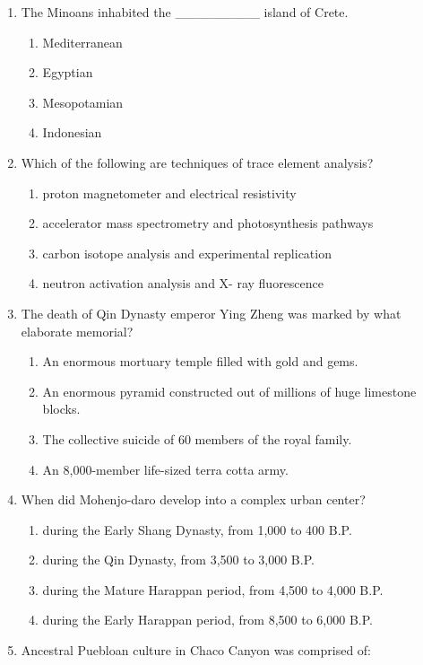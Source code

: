 \documentclass[12pt]{article}
\begin{document}
\begin{enumerate}[label=\arabic*.]
\begin{enumerate}[label=(\alph*)]
    \item genera,
\end{enumerate}
\item The Minoans inhabited the \_\_\_\_\_\_\_\_\_ island of Crete.
\begin{enumerate}[label=(\alph*)]
    \item Mediterranean
    \item Egyptian
    \item Mesopotamian
    \item Indonesian
\end{enumerate}
\item Which of the following are techniques of trace element analysis?
\begin{enumerate}[label=(\alph*)]
    \item proton magnetometer and electrical resistivity
    \item accelerator mass spectrometry and photosynthesis pathways
    \item carbon isotope analysis and experimental replication
    \item neutron activation analysis and X- ray fluorescence
\end{enumerate}
\item The death of Qin Dynasty emperor Ying Zheng was marked by what elaborate memorial?
\begin{enumerate}[label=(\alph*)]
    \item An enormous mortuary temple filled with gold and gems.
    \item An enormous pyramid constructed out of millions of huge limestone blocks.
    \item The collective suicide of 60 members of the royal family.
    \item An 8,000-member life-sized terra cotta army.
\end{enumerate}
\item When did Mohenjo-daro develop into a complex urban center?
\begin{enumerate}[label=(\alph*)]
    \item during the Early Shang Dynasty, from 1,000 to 400 B.P.
    \item during the Qin Dynasty, from 3,500 to 3,000 B.P.
    \item during the Mature Harappan period, from 4,500 to 4,000 B.P.
    \item during the Early Harappan period, from 8,500 to 6,000 B.P.
\end{enumerate}
\item Ancestral Puebloan culture in Chaco Canyon was comprised of:

\end{enumerate}
\end{document}

